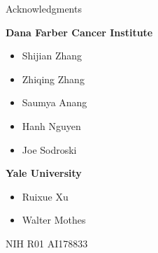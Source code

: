 \begin{frame}[fragile]{Acknowledgments}
    \begin{center}
        \begin{minipage}[t][.6\textheight]{0.45\textwidth}
            \textcolor{DUred}{\bf Dana Farber Cancer Institute}
            \begin{itemize}
                \item[] Shijian Zhang
                \item[] Zhiqing Zhang
                \item[] Saumya Anang
                \item[] Hanh Nguyen
                \item[] Joe Sodroski
            \end{itemize}
        \end{minipage}\hfill
        \begin{minipage}[t][.6\textheight]{0.45\textwidth}
            \textcolor{DUred}{\bf Yale University}
            \begin{itemize}
                \item[] Ruixue Xu
                \item[] Walter Mothes
            \end{itemize}
        \end{minipage}

        \color{DUgreen}{\bf Funding:} NIH R01 AI178833
    \end{center}
\end{frame}

